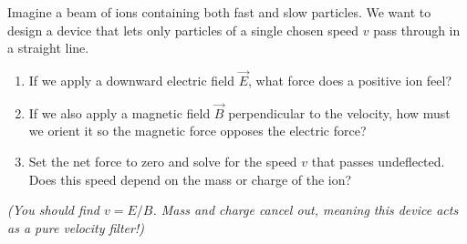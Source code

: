 \begin{whiteboard}
Imagine a beam of ions containing both fast and slow particles. We want to design a device that lets only particles of a single chosen speed $v$ pass through in a straight line.
\begin{enumerate}[label=(\alph*), leftmargin=2.5em, itemsep=1pt]
  \item If we apply a downward electric field $\vec{E}$, what force does a positive ion feel?
  \item If we also apply a magnetic field $\vec{B}$ perpendicular to the velocity, how must we orient it so the magnetic force opposes the electric force?
  \item Set the net force to zero and solve for the speed $v$ that passes undeflected. Does this speed depend on the mass or charge of the ion?
\end{enumerate}
\textit{(You should find $v = E/B$. Mass and charge cancel out, meaning this device acts as a pure velocity filter!)}
\end{whiteboard}
